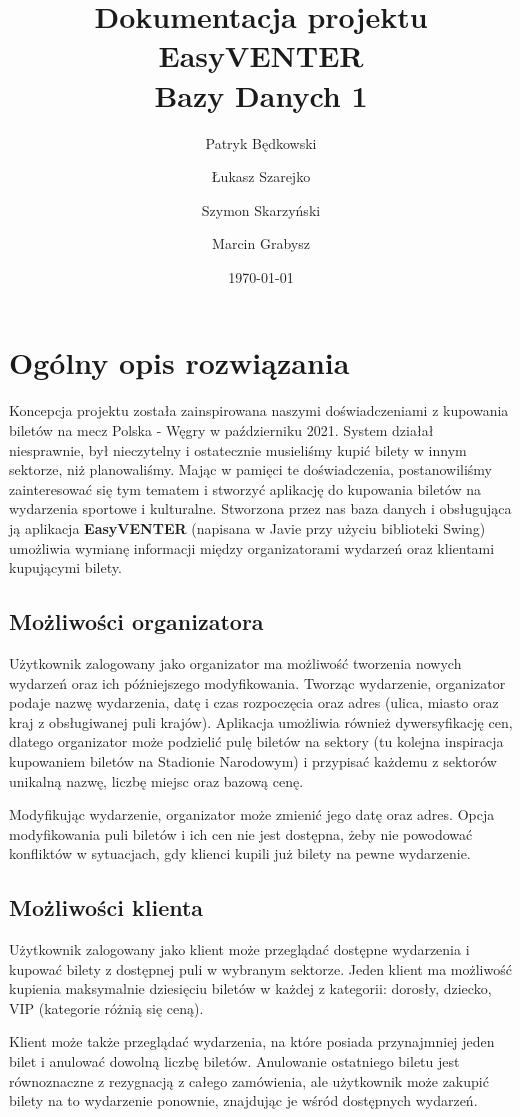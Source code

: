 \documentclass[12pt]{article}
\title{
    Dokumentacja projektu EasyVENTER \\
    \large Bazy Danych 1
    }
\author{Patryk Będkowski \and Łukasz Szarejko \and Szymon Skarzyński \and Marcin Grabysz}
\date{\today}
\begin{document}
\maketitle

\section{Ogólny opis rozwiązania}

    Koncepcja projektu została zainspirowana naszymi doświadczeniami z kupowania biletów na mecz Polska - Węgry w październiku 2021. System działał niesprawnie, był nieczytelny i ostatecznie musieliśmy kupić bilety w innym sektorze, niż planowaliśmy. Mając w pamięci te doświadczenia, postanowiliśmy zainteresować się tym tematem i stworzyć aplikację do kupowania biletów na wydarzenia sportowe i kulturalne. Stworzona przez nas baza danych i obsługująca ją aplikacja \textbf{EasyVENTER} (napisana w Javie przy użyciu biblioteki Swing) umożliwia wymianę informacji między organizatorami wydarzeń oraz klientami kupującymi bilety.
    
    \subsection{Możliwości organizatora}
        
        Użytkownik zalogowany jako organizator ma możliwość tworzenia nowych wydarzeń oraz ich późniejszego modyfikowania. Tworząc wydarzenie, organizator podaje nazwę wydarzenia, datę i czas rozpoczęcia oraz adres (ulica, miasto oraz kraj z obsługiwanej puli krajów). Aplikacja umożliwia również dywersyfikację cen, dlatego organizator może podzielić pulę biletów na sektory (tu kolejna inspiracja kupowaniem biletów na Stadionie Narodowym) i przypisać każdemu z sektorów unikalną nazwę, liczbę miejsc oraz bazową cenę.
        \\ \par
        Modyfikując wydarzenie, organizator może zmienić jego datę oraz adres. Opcja modyfikowania puli biletów i ich cen nie jest dostępna, żeby nie powodować konfliktów w sytuacjach, gdy klienci kupili już bilety na pewne wydarzenie.
        
    \subsection{Możliwości klienta}
    
        Użytkownik zalogowany jako klient może przeglądać dostępne wydarzenia i kupować bilety z dostępnej puli w wybranym sektorze. Jeden klient ma możliwość kupienia maksymalnie dziesięciu biletów w każdej z kategorii: dorosły, dziecko, VIP (kategorie różnią się ceną). 
        \\ \par
        Klient może także przeglądać wydarzenia, na które posiada przynajmniej jeden bilet i anulować dowolną liczbę biletów. Anulowanie ostatniego biletu jest równoznaczne z rezygnacją z całego zamówienia, ale użytkownik może zakupić bilety na to wydarzenie ponownie, znajdując je wśród dostępnych wydarzeń.
    
\end{document}
